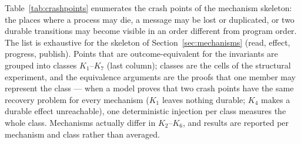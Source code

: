 Table~\ref{tab:crashpoints} enumerates the crash points of the mechanism skeleton: the places
where a process may die, a message may be lost or duplicated, or two durable transitions may
become visible in an order different from program order. The list is exhaustive for the skeleton
of Section~\ref{sec:mechanisms} (read, effect, progress, publish). Points that are
outcome-equivalent for the invariants are grouped into classes $K_1$--$K_7$ (last column); classes
are the cells of the structural experiment, and the equivalence arguments are the proofs that one
member may represent the class --- when a model proves that two crash points have the same
recovery problem for every mechanism ($K_1$ leaves nothing durable; $K_4$ makes a durable effect
unreachable), one deterministic injection per class measures the whole class. Mechanisms actually
differ in $K_2$--$K_6$, and results are reported per mechanism and class rather than averaged.

